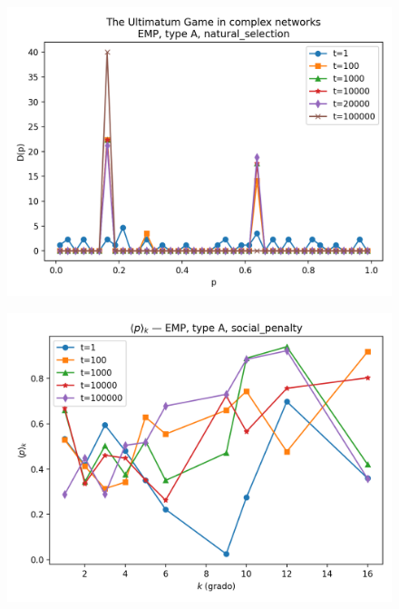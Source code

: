 \begin{figure}[H]
\centering
    \begin{minipage}[t]{0.48\textwidth}
        \centering
        \includegraphics[width=\textwidth]{images/TASK1/Dp_EMP_A_natural_selection.png}
        \label{fig:EMP_Dp_A_NS}
    \end{minipage}
    \hfill
    \begin{minipage}[t]{0.48\textwidth}
        \centering
        \includegraphics[width=\textwidth]{images/TASK1/p_by_degree_EMP_A_social_penalty.png}
        \label{fig:EMP_p_by_degree_A_SP}
    \end{minipage}
\end{figure}


